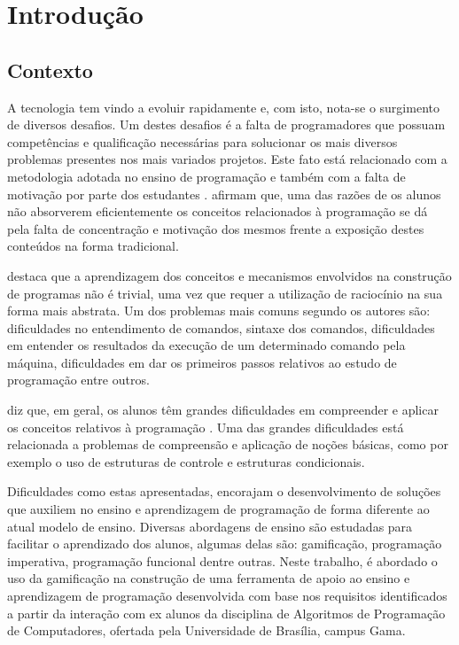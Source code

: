 \chapter[Introdução]{Introdução}

\section{Contexto}
A tecnologia tem vindo a evoluir rapidamente e, com isto, nota-se o surgimento de
diversos desafios. Um destes desafios é a falta de programadores que possuam competências 
e qualificação necessárias para solucionar os mais diversos problemas presentes nos mais
variados projetos. Este fato está relacionado com a metodologia adotada no ensino de
programação e também com a falta de motivação por parte dos estudantes \cite{7975788}.
 afirmam que, uma das razões de os alunos não absorverem eficientemente
os conceitos relacionados à programação se dá pela falta de concentração e motivação dos mesmos frente
a exposição destes conteúdos na forma tradicional.

 destaca que a aprendizagem dos conceitos e mecanismos envolvidos na construção de programas não é
trivial, uma vez que requer a utilização de raciocínio na sua forma mais abstrata. Um dos problemas mais comuns segundo os autores
são: dificuldades no entendimento de comandos, sintaxe dos comandos, dificuldades em entender os resultados da execução de um determinado 
comando pela máquina, dificuldades em dar os primeiros passos relativos ao estudo de programação entre outros.

 diz que, em geral, os alunos têm grandes dificuldades em compreender e aplicar os conceitos relativos à programação . Uma das grandes 
dificuldades está relacionada a problemas de compreensão e aplicação de noções básicas, como por exemplo o uso de estruturas de controle e estruturas
condicionais.

Dificuldades como estas apresentadas, encorajam o desenvolvimento de soluções que auxiliem no ensino e aprendizagem de programação de forma diferente ao
atual modelo de ensino. Diversas abordagens de ensino são estudadas para facilitar o aprendizado dos alunos, algumas delas são:
gamificação, programação imperativa, programação funcional dentre outras. Neste trabalho, é abordado o uso da gamificação na construção de uma ferramenta
de apoio ao ensino e aprendizagem de programação desenvolvida com base nos requisitos identificados a partir da interação com ex alunos
da disciplina de Algoritmos de Programação de Computadores, ofertada pela Universidade de Brasília, campus Gama.

